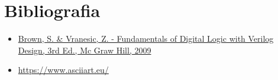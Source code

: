 \section{Bibliografia} %



\begin{frame}{\insertsection} 
	\begin{itemize}
		\item \href{https://www.google.com.br/search?q=filetype\%3Apdf+Fundamentals+of+Digital+Logic+with+Verilog+Design+&oq=filetype\%3Apdf}{Brown, S. \& Vranesic, Z. - Fundamentals of Digital Logic with Verilog Design, 3rd Ed., Mc Graw Hill, 2009}
		\item \href{https://www.asciiart.eu/}{https://www.asciiart.eu/}
	\end{itemize}
\end{frame}


\begin{frame}
	\titlepage
\end{frame} 

